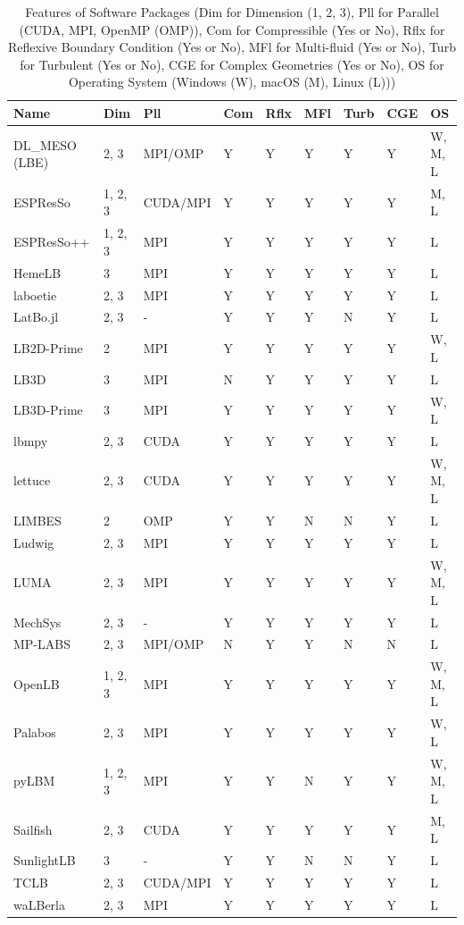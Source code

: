 \documentclass[final, 3p, times, authoryear]{elsarticle}
\begin{document}
\begin{table}
	\begin{center}
		\begin{tabular}{ p{3cm}llllllll}
			\hline
			Name & Dim & Pll & Com & Rflx & MFl & Turb & CGE & OS\\
			\hline
			DL\_MESO (LBE) & 2, 3 & MPI/OMP & Y & Y & Y & Y & Y & W, M, L\\
			ESPResSo & 1, 2, 3 & CUDA/MPI & Y & Y & Y & Y & Y & M, L\\
			ESPResSo++ & 1, 2, 3 & MPI & Y & Y & Y & Y & Y & L\\
			HemeLB & 3 & MPI & Y & Y & Y & Y & Y & L\\
			laboetie & 2, 3 & MPI & Y & Y & Y & Y & Y & L\\
			LatBo.jl & 2, 3 & - & Y & Y & Y & N & Y & L\\
			LB2D-Prime & 2 & MPI & Y & Y & Y & Y & Y & W, L\\
			LB3D & 3 & MPI & N & Y & Y & Y & Y & L\\
			LB3D-Prime & 3 & MPI & Y & Y & Y & Y & Y & W, L\\
			lbmpy & 2, 3 & CUDA & Y & Y & Y & Y & Y & L\\
			lettuce & 2, 3 & CUDA & Y & Y & Y & Y & Y & W, M, L\\
			LIMBES & 2 & OMP & Y & Y & N & N & Y & L\\
			Ludwig & 2, 3 & MPI & Y & Y & Y & Y & Y & L\\
			LUMA & 2, 3 & MPI & Y & Y & Y & Y & Y & W, M, L\\
			MechSys & 2, 3 & - & Y & Y & Y & Y & Y & L\\
			MP-LABS & 2, 3 & MPI/OMP & N & Y & Y & N & N & L\\
			OpenLB & 1, 2, 3 & MPI & Y & Y & Y & Y & Y & W, M, L\\
			Palabos & 2, 3 & MPI & Y & Y & Y & Y & Y & W, L\\
			pyLBM & 1, 2, 3 & MPI & Y & Y & N & Y & Y & W, M, L\\
			Sailfish & 2, 3 & CUDA & Y & Y & Y & Y & Y & M, L\\
			SunlightLB & 3 & - & Y & Y & N & N & Y & L\\
			TCLB & 2, 3 & CUDA/MPI & Y & Y & Y & Y & Y & L\\
			waLBerla & 2, 3 & MPI & Y & Y & Y & Y & Y & L\\
			\hline
		\end{tabular}
		\caption{Features of Software Packages (Dim for Dimension (1, 2, 3),
			Pll for Parallel (CUDA, MPI, OpenMP (OMP)), Com for Compressible (Yes or No), Rflx for
			Reflexive Boundary Condition (Yes or No), MFl for Multi-fluid (Yes or
			No), Turb for Turbulent (Yes or No), CGE for Complex Geometries (Yes or No), OS for Operating System (Windows (W), macOS (M), Linux (L)))} \label{tbl_features}
	\end{center}
\end{table}
\end{document}
